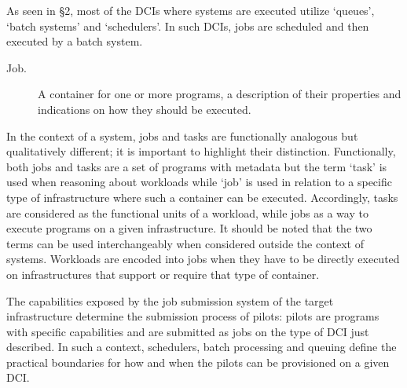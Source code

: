 \documentclass{sig-alternate}
\begin{document}
As seen in \S2, most of the DCIs where \pilotjobs systems are executed utilize `queues', `batch systems' and `schedulers'. In such DCIs, jobs are scheduled and then executed by a batch system.


\begin{description}
\item[Job.] A container for one or more programs, a description of their properties and indications on how they should be executed.
\end{description}

In the context of a \pilotjob system, jobs and tasks are functionally
analogous but qualitatively different; it is important to highlight
their distinction. Functionally, both jobs and tasks are a set of
programs with metadata but the term `task' is used when reasoning
about workloads while `job' is used in relation to a specific type of
infrastructure where such a container can be executed. Accordingly,
tasks are considered as the functional units of a workload, while jobs
as a way to execute programs on a given infrastructure. It should be
noted that the two terms can be used interchangeably when considered
outside the context of \pilotjob systems. Workloads are encoded into
jobs when they have to be directly executed on infrastructures that
support or require that type of container.


The capabilities exposed by the job submission system of the target
infrastructure determine the submission process of pilots: pilots are
programs with specific capabilities and are submitted as jobs on the
type of DCI just described. In such a context, schedulers, batch
processing and queuing define the practical boundaries for how and
when the pilots can be provisioned on a given DCI.


\end{document}
